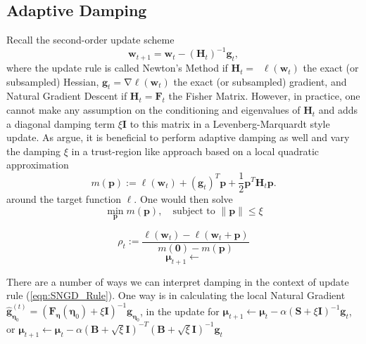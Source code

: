 \documentclass[a4paper, 11pt, oneside]{scrartcl}
\theoremstyle{break}
\DeclareMathOperator{\grad}{\nabla}
\DeclareMathOperator{\Hessian}{\nabla^2}
\newcommand{\matr}[1]{\boldsymbol{#1}}
\numberwithin{equation}{section}
\begin{document}
		\subsection{Adaptive Damping}
			Recall the second-order update scheme 
			\begin{equation}
				\matr{w}_{t+1} = \matr{w}_t - (\matr{H}_t)^{-1} \matr{g}_t,
			\end{equation}
			where the update rule is called Newton's Method if $\matr{H}_t = \Hessian \ell(\matr{w}_t)$ the exact (or subsampled) Hessian, $\matr{g}_t = \grad \ell (\matr{w}_t)$ the exact (or subsampled) gradient, and Natural Gradient Descent if $\matr{H}_t = \matr{F}_t$ the Fisher Matrix.
			However, in practice, one cannot make any assumption on the conditioning and eigenvalues of $\matr{H}_t$ and adds a diagonal damping term $\xi \matr{I}$ to this matrix in a Levenberg-Marquardt style update.
			As \parencite{MG15} argue, it is beneficial to perform adaptive damping as well and vary the damping $\xi$ in a trust-region like approach based on a local quadratic approximation
			\begin{equation*}
				m(\matr{p}) := \ell(\matr{w}_t) + (\matr{g}_t)^T \matr{p} + \frac{1}{2} \matr{p}^T \matr{H}_t \matr{p}.
				\label{eqn:TrustRegionFunction}
			\end{equation*}
			around the target function $\ell$. 
			One would then solve 
			\begin{equation}
				\min_{\matr{p}} m(\matr{p}), \quad \text{subject to } \|\matr{p}\| \le \xi
				\label{eqn:TrustRegion}
			\end{equation}

			\begin{equation}
				\rho_t := \frac{\ell (\matr{w}_t) - \ell (\matr{w}_t + \matr{p})}{m(\matr{0}) - m(\matr{p})}
				\label{eqn:TrustRegionApproximationQuality}
			\end{equation}
			\begin{equation}
				\matr{\mu}_{t+1} \leftarrow 
			\end{equation}

			There are a number of ways we can interpret damping in the context of update rule (\ref{eqn:SNGD_Rule}). 
			One way is in calculating the local Natural Gradient $\matr{\hat{g}}_{\matr{\eta}_0}^{(t)} = (\matr{F}_{\matr{\eta}} (\matr{\eta}_0) + \xi \matr{I})^{-1} \matr{g}_{\matr{\eta}_0}$, in the update for $\matr{\mu}_{t+1} \leftarrow \matr{\mu}_t - \alpha (\matr{S} + \xi \matr{I})^{-1} \matr{g}_t$, or $\matr{\mu}_{t+1} \leftarrow \matr{\mu}_t - \alpha (\matr{B} + \sqrt{\xi} \matr{I})^{-T} (\matr{B} + \sqrt{\xi} \matr{I})^{-1} \matr{g}_t$
\end{document}
